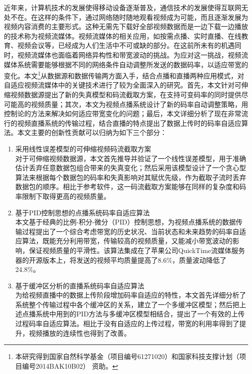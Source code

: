 \begin{cabstract}
近年来，计算机技术的发展使得移动设备逐渐普及，通信技术的发展使得互联网无处不在。在这样的条件下，通过网络随时随地观看视频成为可能，而且逐渐发展为视频内容消费的主要形式。这种无需先下载好全部视频数据而是一边下载一边播放的技术称为视频流媒体。视频流媒体的相关应用，如按需点播、实时直播、在线教育、视频会议等，已经成为人们生活中不可或缺的部分。在这前所未有的机遇同时，视频流媒体也面临着网络异构性和带宽波动的挑战。为应对这一挑战，视频流媒体系统需要能够根据不同的网络条件自动调整所发送的数据码率，以适应带宽的变化。本文\footnote{本研究得到国家自然科学基金（项目编号61271020）和国家科技支撑计划（项目编号2014BAK10B02） 资助。}从数据源和数据传输两方面入手，结合点播和直播两种应用模式，对自适应视频流媒体中的关键技术进行了较为全面深入的研究。首先，本文针对可伸缩视频数据源提出了新的失真模型和码流截取方案，在支持可变码率的同时提供尽可能高的视频质量；其次，本文为视频点播系统设计了新的码率自动调整策略，用控制论的方法来解决如何适应带宽变化的问题；最后，本文详细分析了现在非常流行的视频直播系统的传输过程，结合直播的特点提出了数据上传时的码率自适应算法。本文主要的创新性贡献可以归纳为如下三个部分：
\begin{enumerate}
\item {采用线性误差模型的可伸缩视频码流截取方案}\\
对于可伸缩视频数据源，本文首先推导并验证了一个线性误差模型，用于准确估计丢弃任意数据包组合带来的失真变化；然后采用该模型设计了一个贪心型算法来根据每个数据包的码率和失真影响对其赋优先级，作为截取子流时丢弃数据包的顺序。相比于参考软件，这一码流截取方案能够在同样的复杂度和码率限制下取得更高的视频质量。
\item {基于PID控制思想的点播系统码率自适应算法}\\
本文基于经典的比例-积分-微分（PID）控制思想，为视频点播系统的数据传输过程提出了一个综合考虑带宽的历史状况、当前状态和未来趋势的码率自适应算法，既能充分利用带宽，传输较高的视频质量，又能减小带宽波动的影响，保证视频质量的平滑性。该算法集成在了苹果公司QuickTime流媒体服务器的开源版本上，将发送的视频平均质量提高了8.6\%，质量波动降低了24.8\%。
\item {基于缓冲区分析的直播系统码率自适应算法}\\
为给视频直播中的数据上传阶段增加码率自适应的特性，本文首先详细分析了系统整个传输过程中各个缓冲区的关系，建立了一个多缓冲区模型；然后把上述点播系统中用到的PID方法与多缓冲区模型相结合，提出了一个有效的上传过程码率自适应算法。相比于没有自适应的上传过程，带宽的利用率得到了提升，视频播放的连续性也得到了改善。
\end{enumerate}
\end{cabstract}

